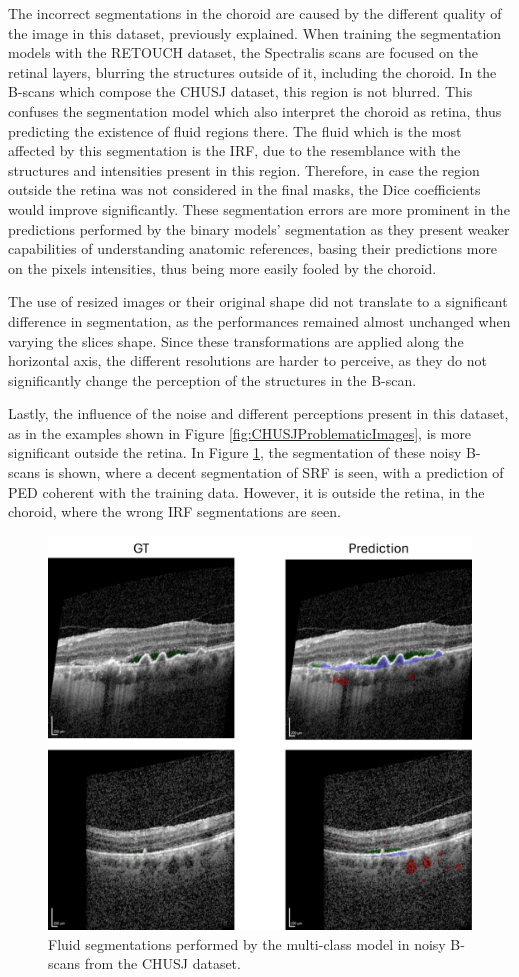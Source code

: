 The incorrect segmentations in the choroid are caused by the different quality of the image in this dataset, previously explained. When training the segmentation models with the RETOUCH dataset, the Spectralis scans are focused on the retinal layers, blurring the structures outside of it, including the choroid. In the B-scans which compose the CHUSJ dataset, this region is not blurred. This confuses the segmentation model which also interpret the choroid as retina, thus predicting the existence of fluid regions there. The fluid which is the most affected by this segmentation is the IRF, due to the resemblance with the structures and intensities present in this region. Therefore, in case the region outside the retina was not considered in the final masks, the Dice coefficients would improve significantly. These segmentation errors are more prominent in the predictions performed by the binary models' segmentation as they present weaker capabilities of understanding anatomic references, basing their predictions more on the pixels intensities, thus being more easily fooled by the choroid.
\par
The use of resized images or their original shape did not translate to a significant difference in segmentation, as the performances remained almost unchanged when varying the slices shape. Since these transformations are applied along the horizontal axis, the different resolutions are harder to perceive, as they do not significantly change the perception of the structures in the B-scan.
\par
Lastly, the influence of the noise and different perceptions present in this dataset, as in the examples shown in Figure \ref{fig:CHUSJProblematicImages}, is more significant outside the retina. In Figure \ref{fig:CHUSJSegmentationOnNoisyScans}, the segmentation of these noisy B-scans is shown, where a decent segmentation of SRF is seen, with a prediction of PED coherent with the training data. However, it is outside the retina, in the choroid, where the wrong IRF segmentations are seen.

\begin{figure}[!ht]
	\centering	\includegraphics[width=0.75\linewidth]{figures/CHUSJSegmentationOnNoisyScans.png}
	\caption{Fluid segmentations performed by the multi-class model in noisy B-scans from the CHUSJ dataset.}
	\label{fig:CHUSJSegmentationOnNoisyScans}
\end{figure}

